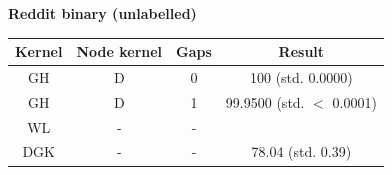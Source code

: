 \documentclass{article}
\begin{document}
\textbf{Reddit binary (unlabelled)}\\
\begin{minipage}{0.6\linewidth}
	\hspace*{-1in}

	\label{fig:reddit_binary_unlabelled}
\end{minipage}
\begin{minipage}[c]{0.5\linewidth}
	
	\centering
	\begin{tabular}{c|c|c|c}
		Kernel & Node kernel & Gaps & Result\\
		\hline
		GH & D & 0 & 100 (std. 0.0000)\\
		GH & D & 1 & 99.9500 (std. $<$ 0.0001)\\
		WL & - & - & \\
		DGK & - & - & 78.04 (std. 0.39)
	\end{tabular}
	\label{table:reddit_binary_unlabelled}
\end{minipage}
\end{document}

